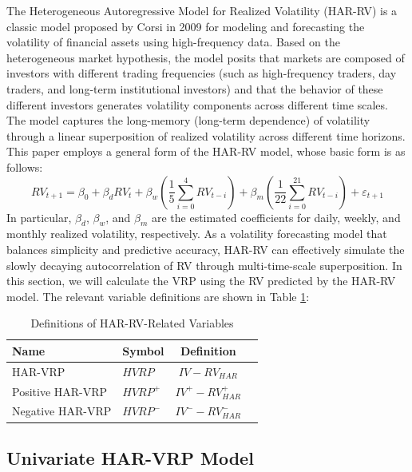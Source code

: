 \documentclass[a4paper, 12pt]{article}    %
\begin{document}
The Heterogeneous Autoregressive Model for Realized Volatility (HAR-RV) is a classic model proposed by Corsi in 2009 for modeling and forecasting the volatility of financial assets using high-frequency data. Based on the heterogeneous market hypothesis, the model posits that markets are composed of investors with different trading frequencies (such as high-frequency traders, day traders, and long-term institutional investors) and that the behavior of these different investors generates volatility components across different time scales. The model captures the long-memory (long-term dependence) of volatility through a linear superposition of realized volatility across different time horizons.
This paper employs a general form of the HAR-RV model, whose basic form is as follows:
\begin{equation}
    RV_{t+1} = \beta_0 + \beta_d RV_t + \beta_w \left( \frac{1}{5} \sum_{i=0}^{4} RV_{t-i} \right) + \beta_m \left( \frac{1}{22} \sum_{i=0}^{21} RV_{t-i} \right) + \varepsilon_{t+1}
\end{equation}
In particular, $\beta_d$, $\beta_w$, and $\beta_m$ are the estimated coefficients for daily, weekly, and monthly realized volatility, respectively.
As a volatility forecasting model that balances simplicity and predictive accuracy, HAR-RV can effectively simulate the slowly decaying autocorrelation of RV through multi-time-scale superposition. In this section, we will calculate the VRP using the RV predicted by the HAR-RV model. The relevant variable definitions are shown in Table \ref{harvariables}:

	\begin{table}[H]
		\centering
		\caption{Definitions of HAR-RV-Related Variables}
		\label{harvariables}
		\renewcommand{\arraystretch}{1.3} %
		\begin{tabular}{llcp{7.5cm}}
			\toprule
			\textbf{Name} & \textbf{Symbol} & \textbf{Definition} \\
			\midrule
			HAR-VRP & $HVRP$ & $IV - RV_{HAR}$ \\
			Positive HAR-VRP & $HVRP^+$ & $IV^+ - RV^+_{HAR}$ \\
			Negative HAR-VRP & $HVRP^-$ & $IV^- - RV^-_{HAR}$ \\
			\bottomrule
		\end{tabular}
	\end{table}

\subsection{Univariate HAR-VRP Model}
\end{document}
